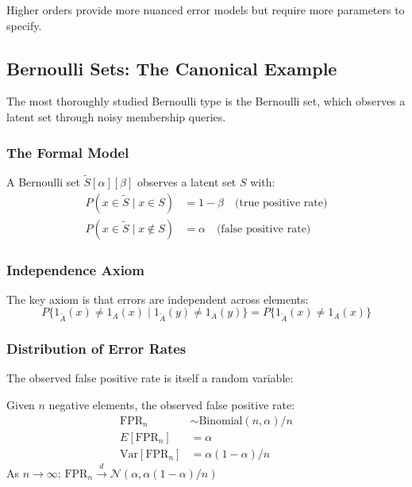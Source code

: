 Higher orders provide more nuanced error models but require more parameters to specify.

\subsection{Bernoulli Sets: The Canonical Example}

The most thoroughly studied Bernoulli type is the Bernoulli set, which observes a latent set through noisy membership queries.

\subsubsection{The Formal Model}

A Bernoulli set $\tilde{S}[\alpha][\beta]$ observes a latent set $S$ with:
\begin{align}
P(x \in \tilde{S} \mid x \in S) &= 1 - \beta \quad \text{(true positive rate)} \\
P(x \in \tilde{S} \mid x \notin S) &= \alpha \quad \text{(false positive rate)}
\end{align}

\subsubsection{Independence Axiom}

The key axiom is that errors are independent across elements:
\begin{equation}
P\{1_{\tilde{A}}(x) \neq 1_A(x) \mid 1_{\tilde{A}}(y) \neq 1_A(y)\} = P\{1_{\tilde{A}}(x) \neq 1_A(x)\}
\end{equation}

\subsubsection{Distribution of Error Rates}

The observed false positive rate is itself a random variable:

\begin{theorem}
Given $n$ negative elements, the observed false positive rate:
\begin{align}
\text{FPR}_n &\sim \text{Binomial}(n, \alpha) / n \\
E[\text{FPR}_n] &= \alpha \\
\text{Var}[\text{FPR}_n] &= \alpha(1-\alpha)/n
\end{align}
As $n \to \infty$: $\text{FPR}_n \xrightarrow{d} \mathcal{N}(\alpha, \alpha(1-\alpha)/n)$
\end{theorem}

